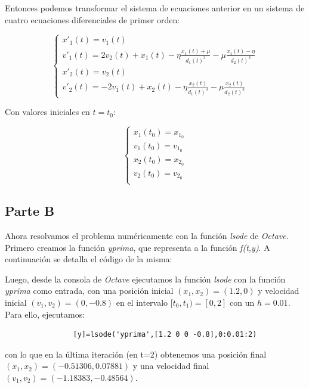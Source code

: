 \documentclass[titlepage,a4paper]{article}
\begin{document}
		Entonces podemos transformar el sistema de ecuaciones anterior en un sistema de cuatro ecuaciones 
		diferenciales de primer orden:

		\begin{equation}
			\begin{cases}
				x'_{1}(t) = v_{1}(t)\\
				v'_{1}(t) = 2v_{2}(t) + x_{1}(t) - \eta\frac{x_{1}(t) + \mu}{d_{1}(t)^{3}} - \mu\frac{x_{1}(t) - \eta}{d_{2}(t)^{3}}\\
				x'_{2}(t) = v_{2}(t)\\				
				v'_{2}(t) = -2v_{1}(t) + x_{2}(t) - \eta\frac{x_{2}(t)}{d_{1}(t)^{3}} - \mu\frac{x_{2}(t)}{d_{2}(t)^{3}}
			\end{cases}
		\end{equation}

		Con valores iniciales en $t=t_{0}$:

		\begin{equation}
			\begin{cases}
				x_{1}(t_{0}) = x_{1_{0}}\\
				v_{1}(t_{0}) = v_{1_{0}}\\
				x_{2}(t_{0}) = x_{2_{0}}\\				
				v_{2}(t_{0}) = v_{2_{0}}\\
			\end{cases}
		\end{equation}

	\subsection{Parte B}\label{sec:parteB}
		Ahora resolvamos el problema numéricamente con la función \emph{lsode} de \emph{Octave}.		
		Primero creamos la función \emph{yprima}, que representa a la función \emph{f(t,y)}.
		A continuación se detalla el código de la misma:

		

		Luego, desde la consola de \emph{Octave} ejecutamos la función \emph{lsode} con la función 
		\emph{yprima} como entrada, con una posición inicial $(x_{1}, x_{2}) = (1.2, 0)$ y velocidad inicial 
		$(v_{1}, v_{2}) = (0, -0.8)$ en el intervalo $[t_{0}, t_{1}) = [0, 2]$ con un $h=0.01$.
		Para ello, ejecutamos:

			\begin{lstlisting}
				[y]=lsode('yprima',[1.2 0 0 -0.8],0:0.01:2)			
			\end{lstlisting}
		con lo que en la última iteración (en t=2) obtenemos una posición final 
		$(x_{1}, x_{2}) = (-0.51306, 0.07881)$ y una velocidad final $(v_{1}, v_{2}) = (-1.18383, -0.48564)$.
\end{document}
